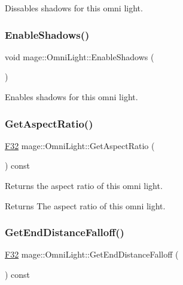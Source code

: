 Dissables shadows for this omni light. \hypertarget{classmage_1_1_omni_light_ad7c2e780dc83eb63fa44e1475492e192}{}\label{classmage_1_1_omni_light_ad7c2e780dc83eb63fa44e1475492e192} 
\subsubsection{\texorpdfstring{Enable\+Shadows()}{EnableShadows()}}
{\footnotesize\ttfamily void mage\+::\+Omni\+Light\+::\+Enable\+Shadows (\begin{DoxyParamCaption}{ }\end{DoxyParamCaption})\hspace{0.3cm}{\ttfamily [noexcept]}}

Enables shadows for this omni light. \hypertarget{classmage_1_1_omni_light_a976a37c3f7c160f0383a93e4f7497eed}{}\label{classmage_1_1_omni_light_a976a37c3f7c160f0383a93e4f7497eed} 
\subsubsection{\texorpdfstring{Get\+Aspect\+Ratio()}{GetAspectRatio()}}
{\footnotesize\ttfamily \hyperlink{namespacemage_aa97e833b45f06d60a0a9c4fc22ae02c0}{F32} mage\+::\+Omni\+Light\+::\+Get\+Aspect\+Ratio (\begin{DoxyParamCaption}{ }\end{DoxyParamCaption}) const\hspace{0.3cm}{\ttfamily [noexcept]}}

Returns the aspect ratio of this omni light.

\begin{DoxyReturn}{Returns}
The aspect ratio of this omni light. 
\end{DoxyReturn}
\hypertarget{classmage_1_1_omni_light_abe17539c94e52b00a1182cd9780dbf77}{}\label{classmage_1_1_omni_light_abe17539c94e52b00a1182cd9780dbf77} 
\subsubsection{\texorpdfstring{Get\+End\+Distance\+Falloff()}{GetEndDistanceFalloff()}}
{\footnotesize\ttfamily \hyperlink{namespacemage_aa97e833b45f06d60a0a9c4fc22ae02c0}{F32} mage\+::\+Omni\+Light\+::\+Get\+End\+Distance\+Falloff (\begin{DoxyParamCaption}{ }\end{DoxyParamCaption}) const\hspace{0.3cm}{\ttfamily [noexcept]}}

